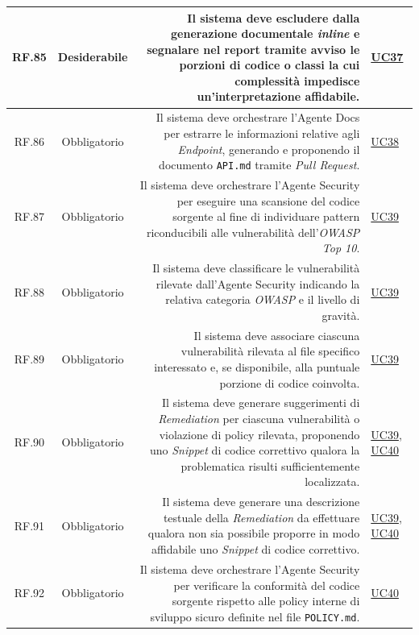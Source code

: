\documentclass[12pt, a4paper]{article}
\begin{document}
\begin{xltabular}{\textwidth}{|c|c|D|F|}
    RF.85 & Desiderabile & Il sistema deve escludere dalla generazione documentale \textit{inline} e segnalare nel report tramite avviso le porzioni di codice o classi la cui complessità impedisce un'interpretazione affidabile. & \hyperref[uc:37]{UC37} \\ \hline
    
    RF.86 & Obbligatorio & Il sistema deve orchestrare l'Agente Docs per estrarre le informazioni relative agli \textit{Endpoint}, generando e proponendo il documento \texttt{API.md} tramite \textit{Pull Request}. & \hyperref[uc:38]{UC38} \\ \hline

    RF.87 & Obbligatorio & Il sistema deve orchestrare l'Agente Security per eseguire una scansione del codice sorgente al fine di individuare pattern riconducibili alle vulnerabilità dell'\textit{OWASP Top 10}. & \hyperref[uc:39]{UC39} \\ \hline
    
    RF.88 & Obbligatorio & Il sistema deve classificare le vulnerabilità rilevate dall'Agente Security indicando la relativa categoria \textit{OWASP} e il livello di gravità. & \hyperref[uc:39]{UC39} \\ \hline
    
    RF.89 & Obbligatorio & Il sistema deve associare ciascuna vulnerabilità rilevata al file specifico interessato e, se disponibile, alla puntuale porzione di codice coinvolta. & \hyperref[uc:39]{UC39} \\ \hline
    
    RF.90 & Obbligatorio & Il sistema deve generare suggerimenti di \textit{Remediation} per ciascuna vulnerabilità o violazione di policy rilevata, proponendo uno \textit{Snippet} di codice correttivo qualora la problematica risulti sufficientemente localizzata. & \hyperref[uc:39]{UC39}, \hyperref[uc:40]{UC40} \\ \hline
    
    RF.91 & Obbligatorio & Il sistema deve generare una descrizione testuale della \textit{Remediation} da effettuare qualora non sia possibile proporre in modo affidabile uno \textit{Snippet} di codice correttivo. & \hyperref[uc:39]{UC39}, \hyperref[uc:40]{UC40} \\ \hline
    
    RF.92 & Obbligatorio & Il sistema deve orchestrare l'Agente Security per verificare la conformità del codice sorgente rispetto alle policy interne di sviluppo sicuro definite nel file \texttt{POLICY.md}. & \hyperref[uc:40]{UC40} \\ \hline
    

\end{xltabular}
\end{document}
